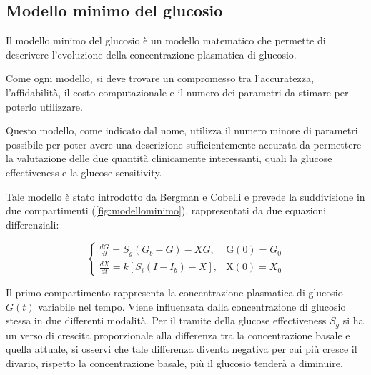 \subsection{Modello minimo del glucosio}



Il modello minimo del glucosio è un modello matematico che permette di descrivere l'evoluzione della concentrazione plasmatica di glucosio. 

Come ogni modello, si deve trovare un compromesso tra l'accuratezza, l'affidabilità, il costo computazionale e il numero dei parametri da stimare per poterlo utilizzare. 

Questo modello, come indicato dal nome, utilizza il numero minore di parametri possibile per poter avere una descrizione sufficientemente accurata da permettere la valutazione delle due quantità clinicamente interessanti, quali la glucose effectiveness e la glucose sensitivity. 

Tale modello è stato introdotto da Bergman e Cobelli \cite{bergman_quantitative_1979} e prevede la suddivisione in due compartimenti (\cref{fig:modellominimo}), rappresentati da due equazioni differenziali:

\begin{equation}
	\begin{cases}\frac{d G}{d t}=S_{g}\left(G_{b}-G\right)-X G, & \mathrm{G}(0)=G_{0} \\ \frac{d X}{d t}=k\left[S_{i}\left(I-I_{b}\right)-X\right], & \mathrm{X}(0)=X_{0}\end{cases}
	\label{eq:modello}
\end{equation}

Il primo compartimento rappresenta la concentrazione plasmatica di glucosio $G(t)$ variabile nel tempo. Viene influenzata dalla concentrazione di glucosio stessa in due differenti modalità. Per il tramite della glucose effectiveness $S_g$ si ha un verso di crescita proporzionale alla differenza tra la concentrazione basale e quella attuale, si osservi che tale differenza diventa negativa per cui più cresce il divario, rispetto la concentrazione basale, più il glucosio tenderà a diminuire. 

